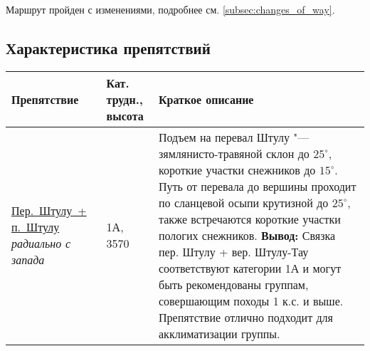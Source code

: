 		Маршрут пройден с изменениями, подробнее см. \ref{subsec:changes_of_way}.

	
	\subsection{Характеристика препятствий}\label{subsec:main_obstacles}

		\setlength{\arraycolsep}{0.5pt}
		\renewcommand{\arraystretch}{1}
		{\small\begin{longtable}{|>{\centering\arraybackslash}m{3.8cm}|>{\centering\arraybackslash}m{1.3cm}|>{\raggedright\arraybackslash}m{12.5cm}|} \hline
		 	Препятствие																																		&	Кат. трудн., высота			&	Краткое описание																																																																																																																																																																																																																																																																																																																																																																																																																																																																																																													\\ \hline
		 	\hyperref[subsec:Day2]{Пер.~Штулу~+ п.~Штулу}															\newline\textit{радиально с запада}		&	1А, 3570					&	Подъем на перевал Штулу "--- зямлянисто-травяной склон до $25^\circ$, короткие участки снежников до $15^\circ$. Путь от перевала до вершины проходит по сланцевой осыпи крутизной до $25^\circ$, также встречаются короткие участки пологих снежников. \newline \textbf{Вывод:} Связка пер. Штулу + вер. Штулу-Тау соответствуют категории 1А и могут быть рекомендованы группам, совершающим походы 1 к.с. и выше. Препятствие отлично подходит для акклиматизации группы. 																																																																																																																																																																																																																																																																																																																																																																																														\\ \hline

\end{longtable}}
